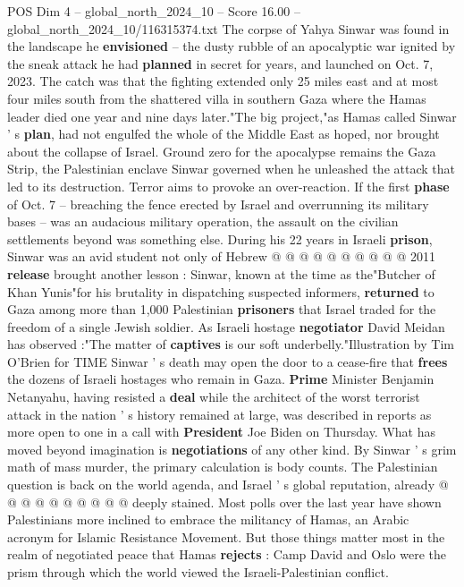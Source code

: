 \begin{textsample}{POS Dim 4 – global\_north\_2024\_10 – Score 16.00 – global\_north\_2024\_10/116315374.txt}  \label{ex:f4_pos_407}
The corpse of Yahya Sinwar was found in the landscape he \textbf{envisioned} -- the dusty rubble of an apocalyptic war ignited by the sneak attack he had \textbf{planned} in secret for years, and launched on Oct. 7, 2023.
The catch was that the fighting extended only 25 miles east and at most four miles south from the shattered villa in southern Gaza where the Hamas leader died one year and nine days later."The big project,"as Hamas called Sinwar ' s \textbf{plan}, had not engulfed the whole of the Middle East as hoped, nor brought about the collapse of Israel.
Ground zero for the apocalypse remains the Gaza Strip, the Palestinian enclave Sinwar governed when he unleashed the attack that led to its destruction.
Terror aims to provoke an over-reaction.
If the first \textbf{phase} of Oct. 7 -- breaching the fence erected by Israel and overrunning its military bases -- was an audacious military operation, the assault on the civilian settlements beyond was something else.
During his 22 years in Israeli \textbf{prison}, Sinwar was an avid student not only of Hebrew @ @ @ @ @ @ @ @ @ @ 2011 \textbf{release} brought another lesson : Sinwar, known at the time as the"Butcher of Khan Yunis"for his brutality in dispatching suspected informers, \textbf{returned} to Gaza among more than 1,000 Palestinian \textbf{prisoners} that Israel traded for the freedom of a single Jewish soldier.
As Israeli hostage \textbf{negotiator} David Meidan has observed :"The matter of \textbf{captives} is our soft underbelly."Illustration by Tim O'Brien for TIME Sinwar ' s death may open the door to a cease-fire that \textbf{frees} the dozens of Israeli hostages who remain in Gaza. \textbf{Prime} Minister Benjamin Netanyahu, having resisted a \textbf{deal} while the architect of the worst terrorist attack in the nation ' s history remained at large, was described in reports as more open to one in a call with \textbf{President} Joe Biden on Thursday.
What has moved beyond imagination is \textbf{negotiations} of any other kind.
By Sinwar ' s grim math of mass murder, the primary calculation is body counts.
The Palestinian question is back on the world agenda, and Israel ' s global reputation, already @ @ @ @ @ @ @ @ @ @ deeply stained.
Most polls over the last year have shown Palestinians more inclined to embrace the militancy of Hamas, an Arabic acronym for Islamic Resistance Movement.
But those things matter most in the realm of negotiated peace that Hamas \textbf{rejects} : Camp David and Oslo were the prism through which the world viewed the Israeli-Palestinian conflict.

\end{textsample}

